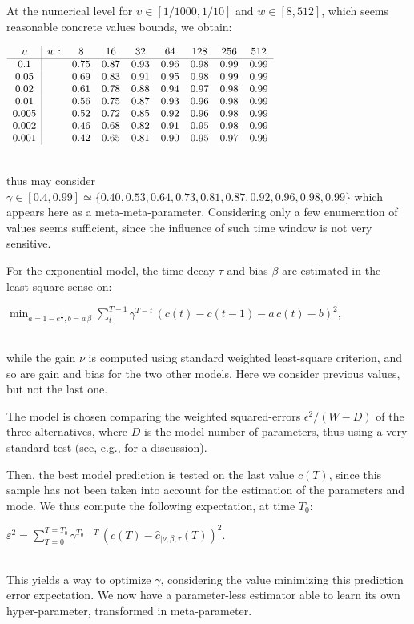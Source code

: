 \documentclass{article}
\newcommand{\eqline}[1]{\\\centerline{$#1$}\\}
\begin{document}
At the numerical level for $\upsilon \in [1/1000, 1/10]$ and $w \in [8, 512]$, which seems reasonable concrete values bounds, we obtain:
\eqline{\small \begin{array}{c|cccccccc} \upsilon & w: &8&16&32&64&128&256&512\\ 
  \hline
   0.1&& 0.75& 0.87& 0.93 & 0.96& 0.98& 0.99& 0.99\\ 
  0.05&& 0.69& 0.83& 0.91& 0.95& 0.98& 0.99& 0.99\\ 
  0.02&& 0.61& 0.78& 0.88& 0.94& 0.97& 0.98& 0.99\\ 
  0.01&& 0.56& 0.75& 0.87& 0.93& 0.96& 0.98& 0.99\\ 
 0.005&& 0.52& 0.72& 0.85& 0.92& 0.96& 0.98& 0.99\\ 
 0.002&& 0.46& 0.68& 0.82& 0.91& 0.95& 0.98& 0.99\\ 
 0.001&& 0.42& 0.65& 0.81& 0.90& 0.95& 0.97& 0.99\\
\end {array}}
thus may consider $\gamma \in [0.4, 0.99] \simeq \{0.40,  0.53,  0.64,  0.73, 0.81,  0.87,  0.92,  0.96,  0.98,  0.99\}$ 
which appears here as a meta-meta-parameter. Considering only a few enumeration of values seems sufficient, since the influence of such time window is not very sensitive.

For the exponential model, the time decay $\tau$ and bias $\beta$ are estimated in the least-square sense on:
\eqline{\min_{a = 1 - e^{\frac{1}{\tau}}, b = a \, \beta} \sum_{t}^{T-1} \gamma^{T-t} \, (c(t) - c(t-1) - a \, c(t) - b)^2,}
while the gain $\nu$ is computed using standard weighted least-square criterion, and so are gain and bias for the two other models. Here we consider previous values, but not the last one.

The model is chosen comparing the weighted squared-errors $\epsilon^2 / (W - D)$ of the three alternatives, where $D$ is the model number of parameters, thus using a very standard test (see, e.g., \cite{vieville:inria-00000172} for a discussion).

Then, the best model prediction is tested on the last value $c(T)$, since this sample has not been taken into account for the estimation of the parameters and mode. We thus compute the following expectation, at time $T_0$:
\eqline{\varepsilon^2 = \sum_{T=0}^{T=T_0} \gamma^{T_0-T} \,  (c(T) - \hat{c}_{|\nu,\beta,\tau}(T))^2.}
This yields a way to optimize $\gamma$, considering the value minimizing this prediction error expectation. We now have a parameter-less estimator able to learn its own hyper-parameter, transformed in meta-parameter.
\end{document}
